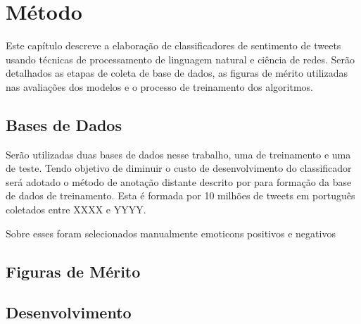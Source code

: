 \chapter{Método}
\label{chapter:method}

Este capítulo descreve a elaboração de classificadores de sentimento de tweets
usando técnicas de processamento de linguagem natural e ciência de redes.
Serão detalhados as etapas de coleta de base de dados, as figuras de mérito
utilizadas nas avaliações dos modelos e o processo de treinamento dos
algoritmos.

\section{Bases de Dados}

Serão utilizadas duas bases de dados nesse trabalho, uma de treinamento e uma de
teste.
Tendo objetivo de diminuir o custo de desenvolvimento do classificador será
adotado o método de anotação distante descrito por \citet{go09} para formação da
base de dados de treinamento.
Esta é formada por 10 milhões de tweets em português coletados entre XXXX e YYYY.

Sobre esses foram selecionados manualmente emoticons positivos e negativos

\section{Figuras de Mérito}
\section{Desenvolvimento}
